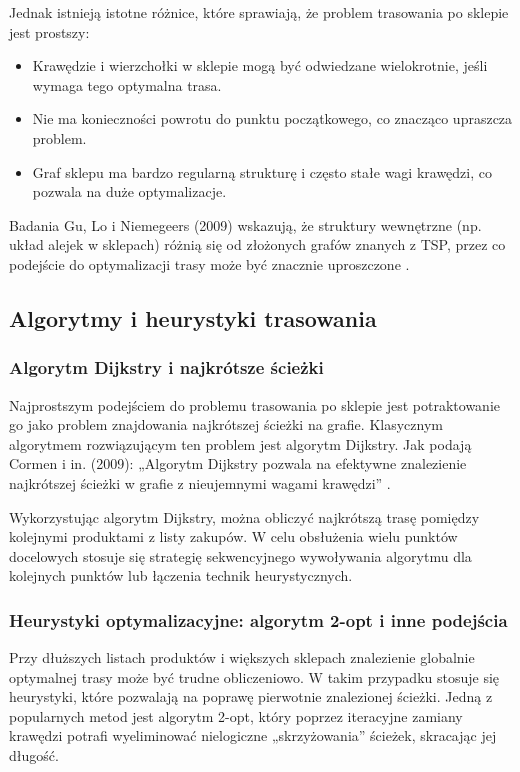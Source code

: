 Jednak istnieją istotne różnice, które sprawiają, że problem trasowania po sklepie jest prostszy:
\begin{itemize}
    \item Krawędzie i wierzchołki w sklepie mogą być odwiedzane wielokrotnie, jeśli wymaga tego optymalna trasa.
    \item Nie ma konieczności powrotu do punktu początkowego, co znacząco upraszcza problem.
    \item Graf sklepu ma bardzo regularną strukturę i często stałe wagi krawędzi, co pozwala na duże optymalizacje.
\end{itemize}

Badania Gu, Lo i Niemegeers (2009) wskazują, że struktury wewnętrzne (np. układ alejek w sklepach) różnią się od złożonych grafów znanych z TSP, przez co podejście do optymalizacji trasy może być znacznie uproszczone \cite{Gu2009}.

\subsection{Algorytmy i heurystyki trasowania}

\subsubsection{Algorytm Dijkstry i najkrótsze ścieżki}
Najprostszym podejściem do problemu trasowania po sklepie jest potraktowanie go jako problem znajdowania najkrótszej ścieżki na grafie. Klasycznym algorytmem rozwiązującym ten problem jest algorytm Dijkstry. Jak podają Cormen i in. (2009): „Algorytm Dijkstry pozwala na efektywne znalezienie najkrótszej ścieżki w grafie z nieujemnymi wagami krawędzi” \cite{Cormen2009}.

Wykorzystując algorytm Dijkstry, można obliczyć najkrótszą trasę pomiędzy kolejnymi produktami z listy zakupów. W celu obsłużenia wielu punktów docelowych stosuje się strategię sekwencyjnego wywoływania algorytmu dla kolejnych punktów lub łączenia technik heurystycznych.

\subsubsection{Heurystyki optymalizacyjne: algorytm 2-opt i inne podejścia}
Przy dłuższych listach produktów i większych sklepach znalezienie globalnie optymalnej trasy może być trudne obliczeniowo. W takim przypadku stosuje się heurystyki, które pozwalają na poprawę pierwotnie znalezionej ścieżki. Jedną z popularnych metod jest algorytm 2-opt, który poprzez iteracyjne zamiany krawędzi potrafi wyeliminować nielogiczne „skrzyżowania” ścieżek, skracając jej długość.

